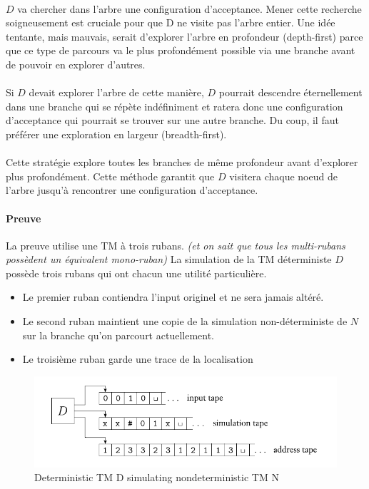 \paragraph{}
$D$ va chercher dans l'arbre une configuration d'acceptance. Mener cette recherche soigneusement est cruciale pour que D ne visite pas l'arbre entier. Une idée tentante, mais mauvais, serait d'explorer l'arbre en profondeur (depth-first) parce que ce type de parcours va le plus profondément possible via une branche avant de pouvoir en explorer d'autres. 

\paragraph{}
Si $D$ devait explorer l'arbre de cette manière, $D$ pourrait descendre éternellement dans une branche qui se répète indéfiniment et ratera donc une configuration d'acceptance qui pourrait se trouver sur une autre branche. Du coup, il faut préférer une exploration en largeur (breadth-first). 

\paragraph{}
Cette stratégie explore toutes les branches de même profondeur avant d'explorer plus profondément. Cette méthode garantit que $D$ visitera chaque noeud de l'arbre jusqu'à rencontrer une configuration d'acceptance.

\paragraph{Preuve} La preuve utilise une TM à trois rubans. \textit{(et on sait que tous les multi-rubans possèdent un équivalent mono-ruban)}
La simulation de la TM déterministe $D$ possède trois rubans qui ont chacun une utilité particulière.
\begin{itemize}
\item Le premier ruban contiendra l'input originel et ne sera jamais altéré.
\item Le second ruban maintient une copie de la simulation non-déterministe de $N$ sur la branche qu'on parcourt actuellement.
\item Le troisième ruban garde une trace de la localisation
\end{itemize}

\begin{figure}[H]
\centering
\includegraphics[width=\textwidth]{img_3_4__0}
\caption{Deterministic TM D simulating nondeterministic TM N}
\end{figure}
